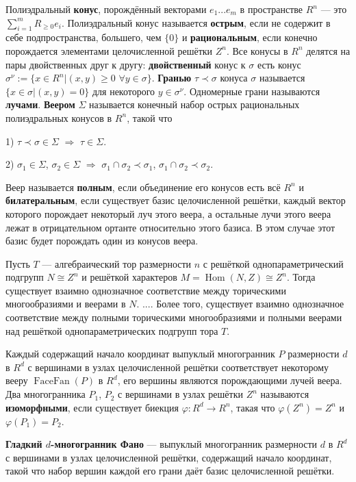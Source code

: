 \documentclass[12pt,notitlepage]{article}
\DeclareMathOperator{\Hom}{Hom}
\DeclareMathOperator{\FF}{FaceFan}
\begin{document}
	
	Полиэдральный \textbf{конус}, порождённый векторами $e_1 ... e_m$ в пространстве $R^n$ --- это $\sum_{i=1}^m R_{\geq 0} e_i$. Полиэдральный конус называется \textbf{острым}, если не содержит в себе подпространства, большего, чем $\{0\}$ и \textbf{рациональным}, если конечно порождается элементами целочисленной решётки $Z^n$. Все конусы в $R^n$ делятся на пары двойственных друг к другу: \textbf{двойственный} конус к $\sigma$ есть конус $\sigma^\nu := \{x \in R^n | (x, y) \geq 0$ $\forall y \in \sigma\}$. \textbf{Гранью} $\tau \prec \sigma$ конуса $\sigma$ называется $\{x \in \sigma |(x, y) = 0\}$ для некоторого $y \in \sigma^\nu$. Одномерные грани называются \textbf{лучами}. \textbf{Веером} $\Sigma$ называется конечный набор острых рациональных полиэдральных конусов в $R^n$, такой что
	
	1) $\tau \prec \sigma \in \Sigma$ $\Rightarrow$ $\tau \in \Sigma$.
	
	2) $\sigma_1 \in \Sigma$, $\sigma_2 \in \Sigma$ $\Rightarrow$ $\sigma_1 \cap \sigma_2 \prec \sigma_1$, $\sigma_1 \cap \sigma_2 \prec \sigma_2$.
	
	Веер называется \textbf{полным}, если объединение его конусов есть всё $R^n$ и \textbf{билатеральным}, если существует базис целочисленной решётки, каждый вектор которого порождает некоторый луч этого веера, а остальные лучи этого веера лежат в отрицательном ортанте относительно этого базиса. В этом случае этот базис будет порождать один из конусов веера.
	
	Пусть $T$ --- алгебраический тор размерности $n$ с решёткой однопараметрический подгрупп $N \cong Z^n$ и решёткой характеров $M = \Hom(N, Z) \cong Z^n$. Тогда существует взаимно однозначное соответствие между торическими многообразиями и веерами в $N$. .... Более того, существует взаимно однозначное соответствие между полными торическими многообразиями и полными веерами над решёткой однопараметрических подгрупп тора $T$.
	
	Каждый содержащий начало координат выпуклый многогранник $P$ размерности $d$ в $R^d$ с вершинами в узлах целочисленной решётки соответствует некоторому вееру $\FF(P)$ в $R^d$, его вершины являются порождающими лучей веера.
	Два многогранника $P_1$, $P_2$ с вершинами в узлах решётки $Z^n$ называются \textbf{изоморфными}, если существует биекция $\varphi:R^d \rightarrow R^n$, такая что $\varphi(Z^n) = Z^n$ и $\varphi(P_1) = P_2$.
	
	\textbf{Гладкий $d$-многогранник Фано} --- выпуклый многогранник размерности $d$ в $R^d$ с вершинами в узлах целочисленной решётки, содержащий начало координат, такой что набор вершин каждой его грани даёт базис целочисленной решётки.
	
\end{document}
